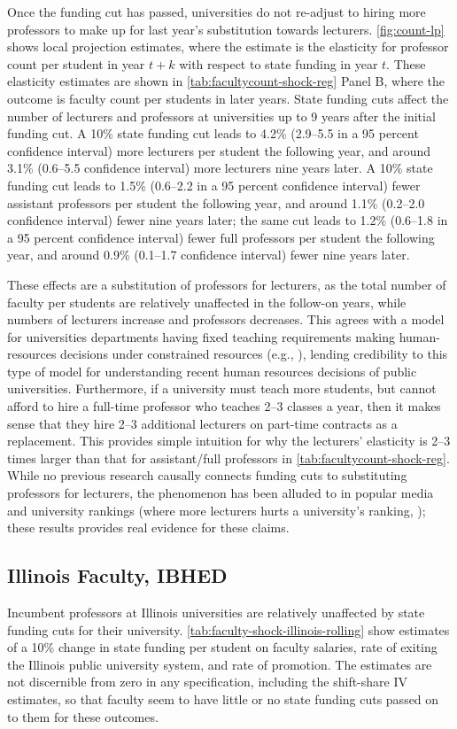 Once the funding cut has passed, universities do not re-adjust to hiring more professors to make up for last year's substitution towards lecturers.
\autoref{fig:count-lp} shows local projection estimates, where the estimate is the elasticity for professor count per student in year $t+k$ with respect to state funding in year $t$.
These elasticity estimates are shown in \autoref{tab:facultycount-shock-reg} Panel B, where the outcome is faculty count per students in later years.
State funding cuts affect the number of lecturers and professors at universities up to 9 years after the initial funding cut.
A 10\% state funding cut leads to 4.2\% (2.9--5.5 in a 95 percent confidence interval) more lecturers per student the following year, and around 3.1\% (0.6--5.5 confidence interval) more lecturers nine years later.
A 10\% state funding cut leads to 1.5\% (0.6--2.2 in a 95 percent confidence interval) fewer assistant professors per student the following year, and around 1.1\% (0.2--2.0 confidence interval) fewer nine years later;
the same cut leads to 1.2\% (0.6--1.8 in a 95 percent confidence interval) fewer full professors per student the following year, and around 0.9\% (0.1--1.7 confidence interval) fewer nine years later.

These effects are a substitution of professors for lecturers, as the total number of faculty per students are relatively unaffected in the follow-on years, while numbers of lecturers increase and professors decreases.
This agrees with a model for universities departments having fixed teaching requirements making human-resources decisions under constrained resources (e.g., \citealt{abe2015implications}), lending credibility to this type of model for understanding recent human resources decisions of public universities.
Furthermore, if a university must teach more students, but cannot afford to hire a full-time professor who teaches 2--3 classes a year, then it makes sense that they hire 2--3 additional lecturers on part-time contracts as a replacement.
This provides simple intuition for why the lecturers' elasticity is 2--3 times larger than that for assistant/full professors in \autoref{tab:facultycount-shock-reg}.
While no previous research causally connects funding cuts to substituting professors for lecturers, the phenomenon has been alluded to in popular media \citep{wiu2016} and university rankings (where more lecturers hurts a university's ranking, \citealt{usnews2023}); these results provides real evidence for these claims.

\subsection{Illinois Faculty, IBHED}
Incumbent professors at Illinois universities are relatively unaffected by state funding cuts for their university.
\autoref{tab:faculty-shock-illinois-rolling} show estimates of a 10\% change in state funding per student on faculty salaries, rate of exiting the Illinois public university system, and rate of promotion.
The estimates are not discernible from zero in any specification, including the shift-share IV estimates, so that faculty seem to have little or no state funding cuts passed on to them for these outcomes.

